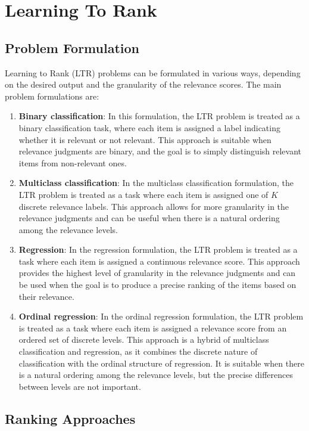 \documentclass[12pt]{article}
\begin{document}
\section{Learning To Rank}

\subsection{Problem Formulation}

Learning to Rank (LTR) problems can be formulated in various ways, depending on the desired output and the granularity of the relevance scores. The main problem formulations are:

\begin{enumerate}
\item {\textbf{Binary classification}: In this formulation, the LTR problem is treated as a binary classification task, where each item is assigned a label indicating whether it is relevant or not relevant. This approach is suitable when relevance judgments are binary, and the goal is to simply distinguish relevant items from non-relevant ones.
}
\item \textbf{Multiclass classification}: In the multiclass classification formulation, the LTR problem is treated as a task where each item is assigned one of $K$ discrete relevance labels. This approach allows for more granularity in the relevance judgments and can be useful when there is a natural ordering among the relevance levels.

\item \textbf{Regression}: In the regression formulation, the LTR problem is treated as a task where each item is assigned a continuous relevance score. This approach provides the highest level of granularity in the relevance judgments and can be used when the goal is to produce a precise ranking of the items based on their relevance.

\item \textbf{Ordinal regression}: In the ordinal regression formulation, the LTR problem is treated as a task where each item is assigned a relevance score from an ordered set of discrete levels. This approach is a hybrid of multiclass classification and regression, as it combines the discrete nature of classification with the ordinal structure of regression. It is suitable when there is a natural ordering among the relevance levels, but the precise differences between levels are not important.
\end{enumerate}
\subsection{Ranking Approaches}
\end{document}
